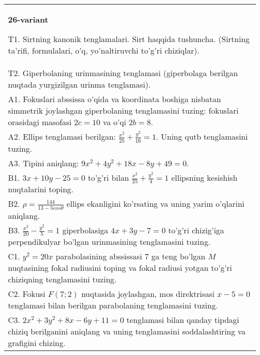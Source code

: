 \documentclass{article}
\begin{document}
\begin{tabular}{m{17cm}}
\textbf{26-variant}
\newline

T1. Sirtning kanonik tenglamalari. Sirt haqqida tushuncha. (Sirtning ta'rifi, formulalari, o'q, yo'naltiruvchi to'g'ri chiziqlar).\\

T2. Giperbolaning urinmasining tenglamasi (giperbolaga berilgan nuqtada yurgizilgan urinma tenglamasi).\\

A1. Fokuslari abssissa o'qida va koordinata boshiga nisbatan simmetrik joylashgan giperbolaning tenglamasini tuzing: fokuslari orasidagi masofasi $2c=10$ va o'qi $2b=8$.\\

A2. Ellips tenglamasi berilgan: $\frac{x^2}{25}+\frac{y^2}{16}=1$. Uning qutb tenglamasini tuzing.\\

A3. Tipini aniqlang: $9x^{2}+4y^{2}+18x-8y+49=0$.\\

B1. $3x + 10y - 25 = 0$ to'g'ri bilan $\frac{x^{2}}{25} + \frac{y^{2}}{4} = 1$ ellipsning kesishish nuqtalarini toping.  \\

B2. $\rho = \frac{144}{13 - 5cos\theta}$ ellips ekanligini ko'rsating va uning yarim o'qlarini aniqlang.\\

B3. $\frac{x^{2}}{20} - \frac{y^{2}}{5} = 1$ giperbolasiga $4x + 3y - 7 = 0$ to'g'ri chizig'iga perpendikulyar bo'lgan urinmasining tenglamasini tuzing.  \\

C1. $y^{2} = 20x$ parabolasining abssissasi 7 ga teng bo'lgan $M$ nuqtasining fokal radiusini toping va fokal radiusi yotgan to'g'ri chiziqning tenglamasini tuzing.  \\

C2. Fokusi $F(7;2)$ nuqtasida joylashgan, mos direktrisasi $x - 5 = 0$ tenglamasi bilan berilgan parabolaning tenglamasini tuzing.  \\

C3. $2x^{2} + 3y^{2} + 8x - 6y + 11 = 0$ tenglamasi bilan qanday tipdagi chiziq berilganini aniqlang va uning tenglamasini soddalashtiring va grafigini chizing.  \\

\end{tabular}
\vspace{1cm}
\end{document}

